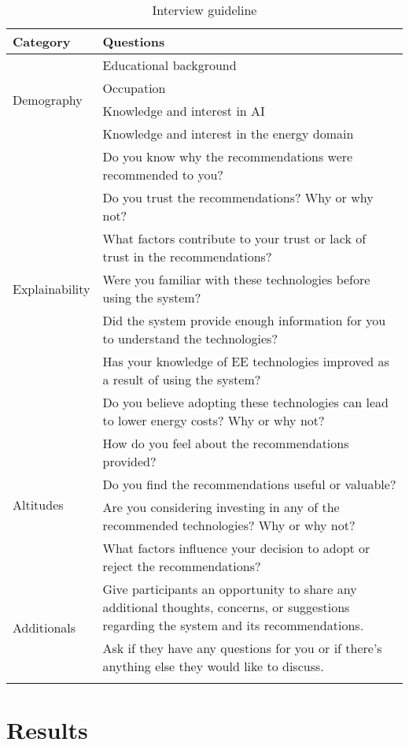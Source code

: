 \begin{center}
    \small
    \begin{longtable}{ | p{} | p{} | }
            \hline  
            \textbf{Category} & \textbf{Questions} \\
            \hline
            \multirow{4}{4em}{Demography} & Educational background \\
            & Occupation \\
            & Knowledge and interest in AI \\
            & Knowledge and interest in the energy domain \\
            \hline
            \multirow{7}{4em}{Explainability} & Do you know why the recommendations were recommended to you? \\
            & Do you trust the recommendations? Why or why not? \\
            & What factors contribute to your trust or lack of trust in the recommendations? \\
            & Were you familiar with these technologies before using the system? \\
            & Did the system provide enough information for you to understand the technologies? \\
            & Has your knowledge of EE technologies improved as a result of using the system? \\
            & Do you believe adopting these technologies can lead to lower energy costs? Why or why not? \\
            \hline
            \multirow{4}{4em}{Altitudes} & How do you feel about the recommendations provided? \\
            & Do you find the recommendations useful or valuable? \\
            & Are you considering investing in any of the recommended technologies? Why or why not? \\
            & What factors influence your decision to adopt or reject the recommendations? \\
            \hline
            \multirow{2}{4em}{Additionals} & Give participants an opportunity to share any additional thoughts, concerns, or suggestions regarding the system and its recommendations. \\
            & Ask if they have any questions for you or if there's anything else they would like to discuss. \\
            \hline
    \caption{Interview guideline}
    \label{tab:interview}
    \end{longtable}
  \end{center}


\section{Results}
